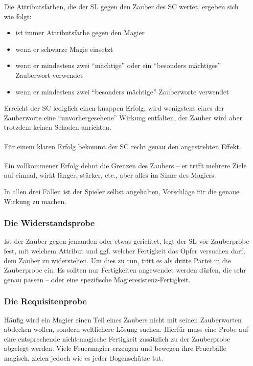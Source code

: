 Die Attributsfarben, die der SL gegen den Zauber des SC wertet, ergeben sich wie folgt:
\begin{itemize}
\item \karo ist immer Attributsfarbe gegen den Magier
\item \herz wenn er schwarze Magie einsetzt
\item \kreuz wenn er mindestens zwei "`mächtige"' oder ein "`besonders mächtiges"' Zauberwort verwendet
\item \pik wenn er mindestens zwei "`besonders mächtige"' Zauberworte verwendet
\end{itemize}
Erreicht der SC lediglich einen knappen Erfolg, wird wenigstens eines der Zauberworte eine "`unvorhergesehene"' Wirkung entfalten, der Zauber wird aber trotzdem keinen Schaden anrichten.\\
\\
Für einem klaren Erfolg bekommt der SC recht genau den angestrebten Effekt.\\
\\
Ein vollkommener Erfolg dehnt die Grenzen des Zaubers -- er trifft mehrere Ziele auf einmal, wirkt länger, stärker, etc., aber alles im Sinne des Magiers. 

In allen drei Fällen ist der Spieler selbst angehalten, Vorschläge für die genaue Wirkung zu machen.

\subsubsection{Die Widerstandsprobe}

Ist der Zauber gegen jemanden oder etwas gerichtet, legt der SL vor Zauberprobe fest, mit welchem Attribut und ggf. welcher Fertigkeit das Opfer versuchen darf, dem Zauber zu widerstehen. Um dies zu tun, tritt es als dritte Partei in die Zauberprobe ein.
Es sollten nur Fertigkeiten angewendet werden dürfen, die sehr genau passen -- oder eine spezifische Magieresistenz-Fertigkeit.

\subsubsection{Die Requisitenprobe}

Häufig wird ein Magier einen Teil eines Zaubers nicht mit seinen Zauberworten abdecken wollen, sondern weltlichere Lösung suchen. Hierfür muss eine Probe auf eine entsprechende nicht-magische Fertigkeit zusätzlich zu der Zauberprobe abgelegt werden. Viele Feuermagier erzeugen und bewegen ihre Feuerbälle magisch, zielen jedoch wie es jeder Bogenschütze tut.

